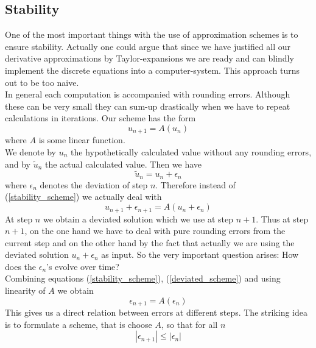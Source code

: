 \documentclass[]{article}
\begin{document}
\subsection{Stability} \label{stability}
One of the most important things with the use of approximation
schemes is to ensure stability.
Actually one could argue that since we have justified all our derivative approximations by Taylor-expansions we are ready and can blindly implement the discrete equations into 
a computer-system. This approach turns out to be too naive.\\
In general each computation is accompanied with rounding errors. Although these can be very small they can sum-up drastically when we have to repeat calculations in iterations.
Our scheme has the form 
\begin{equation} \label{stability_scheme}
u_{n+1}=A(u_{n})
\end{equation}
where $A$ is some linear function. \\
We denote by $u_{n}$ the hypothetically calculated value without any rounding errors, and by $\tilde{u}_{n}$ the actual calculated value. Then we have
\begin{equation}
\tilde{u}_{n}=u_{n}+\epsilon_{n}
\end{equation}
where $\epsilon_{n}$ denotes the deviation of step $n$.
Therefore instead of (\ref{stability_scheme}) we actually deal with
\begin{equation} \label{deviated_scheme}
u_{n+1}+\epsilon_{n+1}=A(u_{n}+\epsilon_{n})
\end{equation}
At step $n$ we obtain a deviated solution which we use at step $n+1$.
Thus at step $n+1$, on the one hand we have to deal with pure rounding errors from the current step and on the other hand by the fact that actually we are using the deviated solution $u_{n}+\epsilon_{n}$ as input.
So the very important question arises: How does the $\epsilon_{n}$'s evolve over time?\\
Combining equations (\ref{stability_scheme}), (\ref{deviated_scheme}) and using linearity of $A$ we obtain
\begin{equation} \label{error_scheme}
\epsilon_{n+1}=A(\epsilon_{n})
\end{equation}
This gives us a direct relation between errors at different steps.
The striking idea is to formulate a scheme, that is choose $A$, so that for all $n$
\begin{equation} \label{scheme_error}
|\epsilon_{n+1}| \leq |\epsilon_{n} |
\end{equation}
\end{document}
